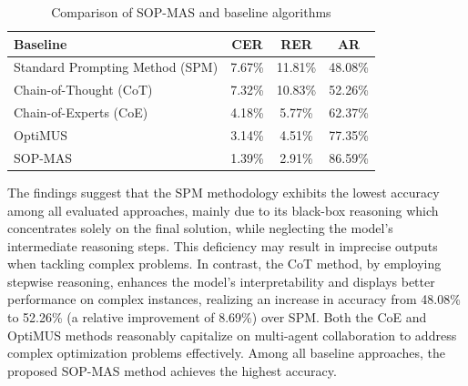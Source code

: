 \documentclass[preprint,12pt]{elsarticle}
\begin{document}

\begin{table}[t]%
\caption{Comparison of SOP-MAS and baseline algorithms}\label{tab:benchmark}

\centering%
\begin{tabular}{l c c c}
\toprule
Baseline & CER & RER & AR \\
\midrule
Standard Prompting Method (SPM) & 7.67\% & 11.81\% & 48.08\% \\
Chain-of-Thought (CoT) & 7.32\% & 10.83\% & 52.26\% \\
Chain-of-Experts (CoE) & 4.18\% & 5.77\% & 62.37\% \\
OptiMUS & 3.14\% & 4.51\% & 77.35\% \\
SOP-MAS & 1.39\% & 2.91\% & 86.59\% \\
\bottomrule
\end{tabular}
\end{table}


The findings suggest that the SPM methodology exhibits the lowest accuracy among all evaluated approaches, mainly due to its black-box reasoning which concentrates solely on the final solution, while neglecting the model's intermediate reasoning steps. This deficiency may result in imprecise outputs when tackling complex problems. In contrast, the CoT method, by employing stepwise reasoning, enhances the model's interpretability and displays better performance on complex instances, realizing an increase in accuracy from 48.08\% to 52.26\% (a relative improvement of 8.69\%) over SPM. Both the CoE and OptiMUS methods reasonably capitalize on multi-agent collaboration to address complex optimization problems effectively. Among all baseline approaches, the proposed SOP-MAS method achieves the highest accuracy.
\end{document}
